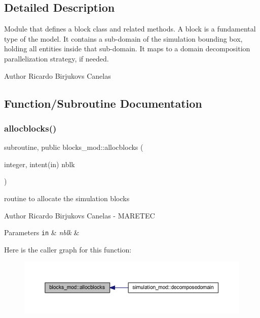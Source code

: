 \subsection{Detailed Description}
Module that defines a block class and related methods. A block is a fundamental type of the model. It contains a sub-\/domain of the simulation bounding box, holding all entities inside that sub-\/domain. It maps to a domain decomposition parallelization strategy, if needed. 

\begin{DoxyAuthor}{Author}
Ricardo Birjukovs Canelas 
\end{DoxyAuthor}


\subsection{Function/\+Subroutine Documentation}
\mbox{\label{namespaceblocks__mod_a639beb0fee2290d46353f4b4702d6711}} 
\subsubsection{\texorpdfstring{allocblocks()}{allocblocks()}}
{\footnotesize\ttfamily subroutine, public blocks\+\_\+mod\+::allocblocks (\begin{DoxyParamCaption}\item[{integer, intent(in)}]{nblk }\end{DoxyParamCaption})}



routine to allocate the simulation blocks 

\begin{DoxyAuthor}{Author}
Ricardo Birjukovs Canelas -\/ M\+A\+R\+E\+T\+EC 
\end{DoxyAuthor}

\begin{DoxyParams}[1]{Parameters}
\mbox{\tt in}  & {\em nblk} & \\
\hline
\end{DoxyParams}
Here is the caller graph for this function\+:\nopagebreak
\begin{figure}[H]
\begin{center}
\leavevmode
\includegraphics[width=350pt]{namespaceblocks__mod_a639beb0fee2290d46353f4b4702d6711_icgraph}
\end{center}
\end{figure}
\mbox{\label{namespaceblocks__mod_a534ca69b17b6f54ee07f995b02feff39}} 
